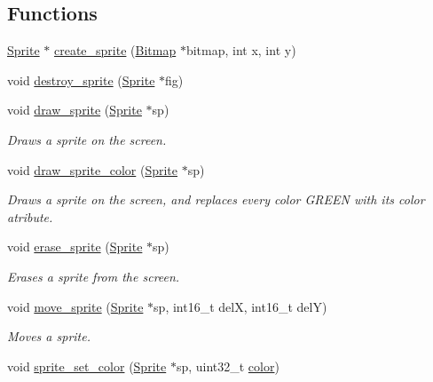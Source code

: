 \subsection*{Functions}
\begin{DoxyCompactItemize}
\item 
\mbox{\hyperlink{struct_sprite}{Sprite}} $\ast$ \mbox{\hyperlink{group__sprite_ga419fef722f3afd383e6d4171ffb54fb1}{create\+\_\+sprite}} (\mbox{\hyperlink{struct_bitmap}{Bitmap}} $\ast$bitmap, int x, int y)
\item 
void \mbox{\hyperlink{group__sprite_ga0b9702271420a69a1603d0a3768fda67}{destroy\+\_\+sprite}} (\mbox{\hyperlink{struct_sprite}{Sprite}} $\ast$fig)
\item 
void \mbox{\hyperlink{group__sprite_ga740994f8c16c38bf18eaabac1f5eeeb9}{draw\+\_\+sprite}} (\mbox{\hyperlink{struct_sprite}{Sprite}} $\ast$sp)
\begin{DoxyCompactList}\small\item\em Draws a sprite on the screen. \end{DoxyCompactList}\item 
void \mbox{\hyperlink{group__sprite_gab5aa8ee6efdb9ebf62df81cad24c445c}{draw\+\_\+sprite\+\_\+color}} (\mbox{\hyperlink{struct_sprite}{Sprite}} $\ast$sp)
\begin{DoxyCompactList}\small\item\em Draws a sprite on the screen, and replaces every color G\+R\+E\+EN with its color atribute. \end{DoxyCompactList}\item 
void \mbox{\hyperlink{group__sprite_ga9c7e23b48dc8ea0f565655744cbae06c}{erase\+\_\+sprite}} (\mbox{\hyperlink{struct_sprite}{Sprite}} $\ast$sp)
\begin{DoxyCompactList}\small\item\em Erases a sprite from the screen. \end{DoxyCompactList}\item 
void \mbox{\hyperlink{group__sprite_ga91bbc8d0a30c581a10b9d193d0d77c43}{move\+\_\+sprite}} (\mbox{\hyperlink{struct_sprite}{Sprite}} $\ast$sp, int16\+\_\+t delX, int16\+\_\+t delY)
\begin{DoxyCompactList}\small\item\em Moves a sprite. \end{DoxyCompactList}\item 
void \mbox{\hyperlink{group__sprite_ga9b18b2f3de6d4ee00e344881a08b17d6}{sprite\+\_\+set\+\_\+color}} (\mbox{\hyperlink{struct_sprite}{Sprite}} $\ast$sp, uint32\+\_\+t \mbox{\hyperlink{structcolor}{color}})

\end{DoxyCompactItemize}
